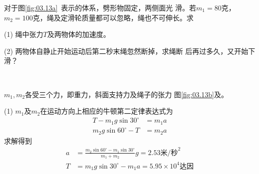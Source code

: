 \example 对于图\ref{fig:03.13a}~表示的体系，劈形物固定，两侧面光
滑。若$  m _ { 1 } = 8 0 \text{克} $，$ m _ { 2 } = 1 0 0 \text{克} $，绳及定滑轮质量都可以忽略，绳也不可伸长。求

(1) 绳中张力$ T $及两物体的加速度。

(2) 两物体自静止开始运动后第二秒末绳忽然断掉，求绳断
后再过多久，又开始下滑？
\begin{figurex}
  \centering
  \\[-0.5em]
   \qquad
  \caption{}
  \label{fig:03.13}
\end{figurex}

\solution $m_1,m_2$各受三个力，即重力，斜面支持力及绳子的张力
\lhbrak 图\ref{fig:03.13b}及\rhbrak。

(1) $m_1$及$m_2$在运动方向上相应的牛顿第二定律表达式为
\begin{align*}
  T - m _ { 1 } g \sin 3 0 ^ { \circ } & = m _ { 1 } a \\[-0.5em]
  m _ { 2 } g \sin 6 0 ^ { \circ } - T & = m _ { 2 } a
\end{align*}
求解得到
\begin{align*}
  a & = \frac { m _ { 2 } \sin 6 0 ^ { \circ } - m _ { 1 } \sin 3 0 ^ { \circ } } { m _ { 1 } + m _ { 2 } } g = 2 . 5 3 \text{米/秒}^2 \\[-0.5em]
  T & = m _ { 1 } g \sin 3 0 ^ { \circ } - m _ { 1 } a = 5 . 9 5 \times 1 0 ^ { 4 } \text{达因}
\end{align*}


